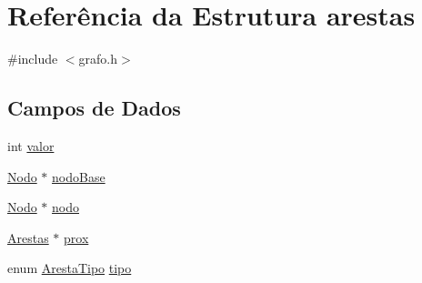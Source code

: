 \hypertarget{structarestas}{
\section{Referência da Estrutura arestas}
\label{structarestas}
}


{\ttfamily \#include $<$grafo.h$>$}

\subsection*{Campos de Dados}
\begin{DoxyCompactItemize}
\item 
int \hyperlink{structarestas_a199638f57a0f2b6cf803f8f80601d9b1}{valor}
\item 
\hyperlink{structnodo}{Nodo} $\ast$ \hyperlink{structarestas_a9729554d791b184a5175d138f71fee27}{nodoBase}
\item 
\hyperlink{structnodo}{Nodo} $\ast$ \hyperlink{structarestas_ac64df5b62250b21f26521387c45390bb}{nodo}
\item 
\hyperlink{structarestas}{Arestas} $\ast$ \hyperlink{structarestas_ad0c8e430207210539b316ac224977f81}{prox}
\item 
enum \hyperlink{grafo_8h_a22fbf7d4e760958794a34d162b0df86e}{ArestaTipo} \hyperlink{structarestas_afc465e4a2aa3103225805d38b9ac6123}{tipo}
\end{DoxyCompactItemize}


